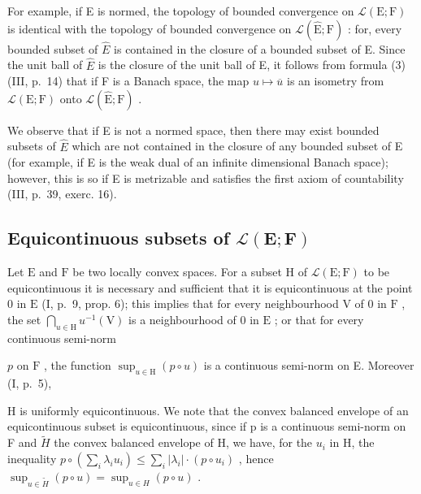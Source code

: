 For example, if E is normed, the topology of bounded convergence on \(\mathcal{L}(\mathrm{E};\mathrm{F})\) is identical with the topology of bounded convergence on \(\mathcal{L}(\hat{\mathrm{E}};\mathrm{F})\) : for, every bounded subset of \(\hat{E}\) is contained in the closure of a bounded subset of E. Since the unit ball of \(\hat{E}\) is the closure of the unit ball of E, it follows from formula (3) (III, p.~14) that if F is a Banach space, the map \(u\mapsto\overline{u}\) is an isometry from \(\mathcal{L}(\mathrm{E};\mathrm{F})\) onto \(\mathcal{L}(\hat{\mathrm{E}};\mathrm{F})\) .

We observe that if E is not a normed space, then there may exist bounded subsets of \(\hat{E}\) which are not contained in the closure of any bounded subset of E (for example, if E is the weak dual of an infinite dimensional Banach space); however, this is so if E is metrizable and satisfies the first axiom of countability (III, p.~39, exerc. 16).

\subsection{\texorpdfstring{Equicontinuous subsets of \(\mathcal{L}(\mathbf{E};\mathbf{F})\)}{Equicontinuous subsets of \textbackslash mathcal\{L\}(\textbackslash mathbf\{E\};\textbackslash mathbf\{F\})}}

Let \(\mathrm{E}\) and \(\mathrm{F}\) be two locally convex spaces. For a subset \(\mathrm{H}\) of \(\mathcal{L}(\mathrm{E};\mathrm{F})\) to be equicontinuous it is necessary and sufficient that it is equicontinuous at the point 0 in \(\mathrm{E}\) (I, p.~9, prop. 6); this implies that for every neighbourhood \(\mathrm{V}\) of 0 in \(\mathrm{F}\) , the set \(\bigcap_{u\in \mathrm{H}}u^{-1}(\mathrm{V})\) is a neighbourhood of 0 in \(\mathrm{E}\) ; or that for every continuous semi-norm

\(p\) on \(\mathrm{F}\) , the function \(\sup_{u\in \mathrm{H}}(p\circ u)\) is a continuous semi-norm on E. Moreover (I, p.~5),

  H is uniformly equicontinuous. We note that the convex balanced envelope of an equicontinuous subset is equicontinuous, since if p is a continuous semi-norm on F and \(\tilde{H}\) the convex balanced envelope of H, we have, for the \(u_{i}\) in H, the inequality \(p \circ (\sum_{i} \lambda_{i} u_{i}) \leqslant \sum_{i} |\lambda_{i}| \cdot (p \circ u_{i})\) , hence \(\sup_{u \in \tilde{H}} (p \circ u) = \sup_{u \in H} (p \circ u)\) .

